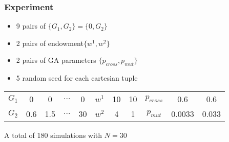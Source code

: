 \begin{frame}
    \frametitle{Experiment}

    \begin{itemize}
        \item 9 pairs of $\{G_1, G_2\} = \{0, G_2 \}$
        \item 2 pairs of endowment$\{w^1, w^2\}$ 
        \item 2 pairs of GA parameters $\{p_{cross}, p_{mut}\}$
        \item 5 random seed for each cartesian tuple 
    \end{itemize}
    
    \begin{table}
        \begin{tabular}{ccccc||ccc||ccc}
            $G_1$ & 0 & 0 & $\dots$ & 0 & $w^1$ & 10 & 10 & $p_{cross}$ & 0.6 & 0.6 \\
            $G_2$ & 0.6 & 1.5 & $\dots$ & 30 & $w^2$ & 4 & 1 & $p_{mut}$ & 0.0033 & 0.033 \\
        \end{tabular}
    \end{table}

    A total of 180 simulations with $N=30$
    

\end{frame}

